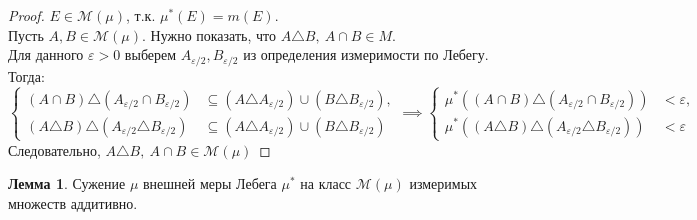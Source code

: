\documentclass[11pt,a4paper]{report}
\def\eps{\varepsilon}
\theoremstyle{definition}
\theoremstyle{definition}
\newtheorem{lemma}{Лемма}[section]
\theoremstyle{definition}
\begin{document}
	\begin{proof}
		$ E \in \mathcal{M}(\mu) $, т.к. $ \mu^{*}(E) = m(E) $.\\ 
		Пусть $ A, B \in \mathcal{M}(\mu) $. Нужно показать, что $ A \triangle B,\ A \cap B \in M $.\\
		Для данного $ \eps > 0 $ выберем $ A_{\eps/2}, B_{\eps/2} $ из определения измеримости по Лебегу. Тогда:\\ 
		\[ 
			\begin{cases}
				(A \cap B) \triangle (A_{\eps/2} \cap B_{\eps/2}) &\subseteq (A \triangle A_{\eps/2}) \cup (B \triangle B_{\eps/2}),\\
				(A \triangle B) \triangle (A_{\eps/2} \triangle B_{\eps/2}) &\subseteq (A \triangle A_{\eps/2}) \cup (B \triangle B_{\eps/2})
			\end{cases} \implies 
			\begin{cases}
				\mu^{*}((A \cap B) \triangle (A_{\eps/2} \cap B_{\eps/2})) &< \eps,\\
				\mu^{*}((A \triangle B) \triangle (A_{\eps/2} \triangle B_{\eps/2})) &< \eps
			\end{cases}
		\]
		Следовательно, $ A \triangle B,\ A \cap B \in \mathcal{M}(\mu) $
	\end{proof}
	\begin{lemma}
		Сужение $ \mu $ внешней меры Лебега $ \mu^{*} $ на класс $ \mathcal{M}(\mu) $ измеримых множеств аддитивно.
	\end{lemma}
\end{document}
